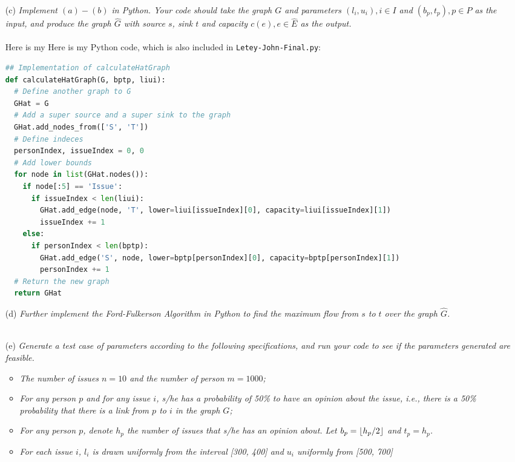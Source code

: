 \documentclass[12pt]{article}
\DeclarePairedDelimiter\floor{\lfloor}{\rfloor}
\begin{document}
{\begin{enumerate}
\item[(c)]\textsl{Implement $(a)-(b)$ in Python. Your code should take the graph $G$ and parameters $(l_i, u_i), i \in I$ and $(b_p, t_p), p \in P$ as the input, and produce the graph $\hat{G}$ with source $s$, sink $t$ and capacity $c(e), e \in \hat{E}$ as the output.}\\ \\
Here is my Here is my Python code, which is also included in \texttt{Letey-John-Final.py}:
\begin{lstlisting}[language=Python]
## Implementation of calculateHatGraph
def calculateHatGraph(G, bptp, liui):
  # Define another graph to G
  GHat = G
  # Add a super source and a super sink to the graph
  GHat.add_nodes_from(['S', 'T'])
  # Define indeces
  personIndex, issueIndex = 0, 0
  # Add lower bounds
  for node in list(GHat.nodes()):
    if node[:5] == 'Issue':
      if issueIndex < len(liui):
        GHat.add_edge(node, 'T', lower=liui[issueIndex][0], capacity=liui[issueIndex][1])
        issueIndex += 1
    else:
      if personIndex < len(bptp):
        GHat.add_edge('S', node, lower=bptp[personIndex][0], capacity=bptp[personIndex][1])
        personIndex += 1
  # Return the new graph
  return GHat
\end{lstlisting}
\item[(d)]\textsl{Further implement the Ford-Fulkerson Algorithm in Python to find the maximum flow from $s$ to $t$ over the graph $\hat{G}$.}\\ \\
\item[(e)]\textsl{Generate a test case of parameters according to the following specifications, and run your code to see if the parameters generated are feasible.}
\begin{itemize}
  \item \textsl{The number of issues $n = 10$ and the number of person $m = 1000$;}
  \item \textsl{For any person $p$ and for any issue $i$, s/he has a probability of 50\% to have an opinion about the issue, i.e., there is a 50\% probability that there is a link from $p$ to $i$ in the graph $G$;}
  \item \textsl{For any person $p$, denote $h_p$ the number of issues that s/he has an opinion about. Let $b_p = \floor{h_p/2}$ and $t_p = h_p$.}
  \item \textsl{For each issue $i$, $l_i$ is drawn uniformly from the interval [300, 400] and $u_i$ uniformly from [500, 700]}
\end{itemize}
\end{enumerate}

}
\end{document}
